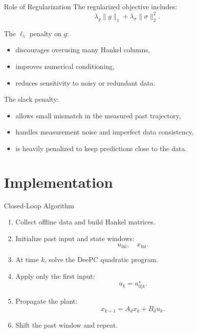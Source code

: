 \documentclass[aspectratio=169,11pt]{beamer}
\begin{document}
\begin{frame}{Role of Regularization}
    The regularized objective includes:
    \[
    \lambda_g\|g\|_1
    +
    \lambda_{\sigma}\|\sigma\|_2^2.
    \]

    \vspace{0.3cm}
    The $\ell_1$ penalty on $g$:
    \begin{itemize}
        \item discourages overusing many Hankel columns,
        \item improves numerical conditioning,
        \item reduces sensitivity to noisy or redundant data.
    \end{itemize}

    \vspace{0.3cm}
    The slack penalty:
    \begin{itemize}
        \item allows small mismatch in the measured past trajectory,
        \item handles measurement noise and imperfect data consistency,
        \item is heavily penalized to keep predictions close to the data.
    \end{itemize}
\end{frame}

\section{Implementation}

\begin{frame}{Closed-Loop Algorithm}
    \begin{enumerate}
        \item Collect offline data and build Hankel matrices.
        \item Initialize past input and state windows:
        \[
        u_{\mathrm{ini}},\quad x_{\mathrm{ini}}.
        \]
        \item At time $k$, solve the DeePC quadratic program.
        \item Apply only the first input:
        \[
        u_k = u^\star_{0|k}.
        \]
        \item Propagate the plant:
        \[
        x_{k+1}=A_d x_k+B_d u_k.
        \]
        \item Shift the past window and repeat.
    \end{enumerate}
\end{frame}
\end{document}

